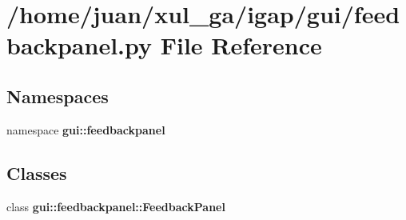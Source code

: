 \section{/home/juan/xul\_\-ga/igap/gui/feedbackpanel.py File Reference}
\label{feedbackpanel_8py}
\subsection*{Namespaces}
\begin{CompactItemize}
\item 
namespace {\bf gui::feedbackpanel}
\end{CompactItemize}
\subsection*{Classes}
\begin{CompactItemize}
\item 
class {\bf gui::feedbackpanel::FeedbackPanel}
\end{CompactItemize}
